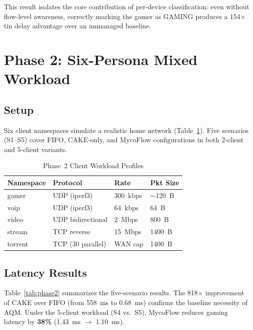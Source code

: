 This result isolates the core contribution of per-device classification: even without flow-level awareness, correctly marking the gamer as GAMING produces a 154$\times$ tin delay advantage over an unmanaged baseline.

\section{Phase 2: Six-Persona Mixed Workload}

\subsection{Setup}

Six client namespaces simulate a realistic home network (Table~\ref{tab:workload}). Five scenarios (S1--S5) cover FIFO, CAKE-only, and MycoFlow configurations in both 2-client and 5-client variants.

\begin{table}[h]
\caption{Phase~2 Client Workload Profiles}
\label{tab:workload}
\centering
\small
\begin{tabular}{llll}
\toprule
\textbf{Namespace} & \textbf{Protocol} & \textbf{Rate} & \textbf{Pkt Size} \\
\midrule
gamer   & UDP (iperf3)        & 300~kbps   & $\sim$120~B \\
voip    & UDP (iperf3)        & 64~kbps    & 64~B \\
video   & UDP bidirectional   & 2~Mbps     & 800~B \\
stream  & TCP reverse         & 15~Mbps    & 1400~B \\
torrent & TCP (30 parallel)   & WAN cap    & 1400~B \\
\bottomrule
\end{tabular}
\end{table}

\subsection{Latency Results}

Table~\ref{tab:phase2} summarizes the five-scenario results. The 818$\times$ improvement of CAKE over FIFO (from 558~ms to 0.68~ms) confirms the baseline necessity of AQM. Under the 5-client workload (S4 vs.\ S5), MycoFlow reduces gaming latency by \textbf{38\%} (1.43~ms $\to$ 1.10~ms).

